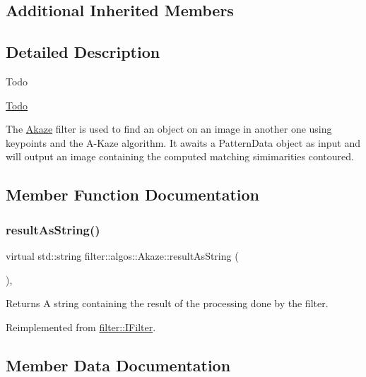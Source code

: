 \subsection*{Additional Inherited Members}


\subsection{Detailed Description}
\begin{DoxyRefDesc}{Todo}
\item[\hyperlink{todo__todo000001}{Todo}]\end{DoxyRefDesc}
The \hyperlink{classfilter_1_1algos_1_1_akaze}{Akaze} filter is used to find an object on an image in another one using keypoints and the A-\/\+Kaze algorithm. It awaits a Pattern\+Data object as input and will output an image containing the computed matching simimarities contoured. 

\subsection{Member Function Documentation}
\mbox{\label{classfilter_1_1algos_1_1_akaze_afbbbf680eb0c14ea7e47dbc78169f32b}} 
\subsubsection{\texorpdfstring{result\+As\+String()}{resultAsString()}}
{\footnotesize\ttfamily virtual std\+::string filter\+::algos\+::\+Akaze\+::result\+As\+String (\begin{DoxyParamCaption}{ }\end{DoxyParamCaption})\hspace{0.3cm}{\ttfamily [inline]}, {\ttfamily [virtual]}}

\begin{DoxyReturn}{Returns}
A string containing the result of the processing done by the filter. 
\end{DoxyReturn}


Reimplemented from \hyperlink{classfilter_1_1_i_filter_ab99902b060a6d9edc3452a8c9f85e37e}{filter\+::\+I\+Filter}.



\subsection{Member Data Documentation}
\mbox{\label{classfilter_1_1algos_1_1_akaze_aee53a5f3f06ed8c533dc4d421115fe6a}} 
